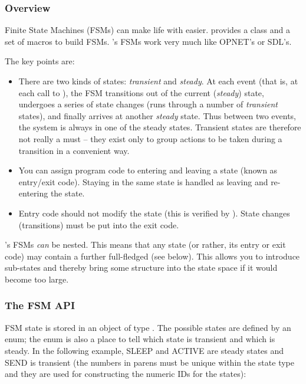 \subsubsection{Overview}


Finite State Machines (FSMs)
can make life with  easier. {\opp} provides a
class and a set of macros to build FSMs. {\opp}'s FSMs work very much
like OPNET's or SDL's.


The key points are:
\begin{itemize}
\item{There are two kinds of states:
    \textit{transient} and
    \textit{steady}. At each event (that is, at
    each call to ), the FSM transitions out of
    the current (\textit{steady}) state, undergoes a series of state
    changes (runs through a number of \textit{transient} states), and
    finally arrives at another \textit{steady} state. Thus between two
    events, the system is always in one of the steady states.
    Transient states are therefore not really a must -- they exist
    only to group actions to be taken during a transition in a
    convenient way.}
\item{You can assign program code to entering and leaving a state
    (known as entry/exit code).
    Staying in the same state is handled as leaving and re-entering
    the state.}
\item{Entry code should not modify the state (this is verified by
    {\opp}).  State changes (transitions) must be put into the exit
    code.}
\end{itemize}

{\opp}'s FSMs \textit{can} be nested. This means
that any state (or rather, its entry or exit code) may contain a
further full-fledged  (see below). This allows you
to introduce sub-states and thereby bring some structure into the
state space if it would become too large.


\subsubsection{The FSM API}


FSM state is stored in an object of type . The possible states
are defined by an enum; the enum is also a place to tell which
state is transient and which is steady. In the following example, SLEEP
and ACTIVE are steady states and SEND is transient (the numbers
in parens must be unique within the state type and they are used
for constructing the numeric IDs for the states):

